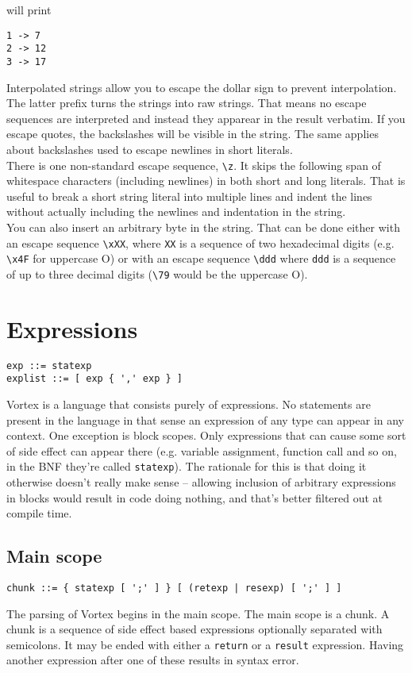 \documentclass{article}
\begin{document}
will print
\begin{lstlisting}[language=text]
1 -> 7
2 -> 12
3 -> 17
\end{lstlisting}
Interpolated strings allow you to escape the dollar sign to prevent
interpolation.
\\
The latter prefix turns the strings into raw strings. That means no escape
sequences are interpreted and instead they apparear in the result verbatim.
If you escape quotes, the backslashes will be visible in the string. The same
applies about backslashes used to escape newlines in short literals.\\
There is one non-standard escape sequence, \verb|\z|. It skips the following
span of whitespace characters (including newlines) in both short and long
literals. That is useful to break a short string literal into multiple lines
and indent the lines without actually including the newlines and indentation
in the string.\\
You can also insert an arbitrary byte in the string. That can be done either
with an escape sequence \verb|\xXX|, where \verb|XX| is a sequence of two
hexadecimal digits (e.g. \verb|\x4F| for uppercase O) or with an escape
sequence \verb|\ddd| where \verb|ddd| is a sequence of up to three decimal
digits (\verb|\79| would be the uppercase O).

\section{Expressions}
\begin{lstlisting}[language=bnf]
exp ::= statexp
explist ::= [ exp { ',' exp } ]
\end{lstlisting}
Vortex is a language that consists purely of expressions. No statements are
present in the language in that sense an expression of any type can appear
in any context. One exception is block scopes. Only expressions that can
cause some sort of side effect can appear there (e.g. variable assignment,
function call and so on, in the BNF they're called \verb|statexp|).
The rationale for this is that doing it otherwise doesn't really make sense
-- allowing inclusion of arbitrary expressions in blocks would result in code
doing nothing, and that's better filtered out at compile time.
\subsection{Main scope}
\begin{lstlisting}[language=bnf]
chunk ::= { statexp [ ';' ] } [ (retexp | resexp) [ ';' ] ]
\end{lstlisting}
The parsing of Vortex begins in the main scope. The main scope is a chunk.
A chunk is a sequence of side effect based expressions optionally separated
with semicolons. It may be ended with either a \verb|return| or a \verb|result|
expression. Having another expression after one of these results in syntax
error.
\end{document}
